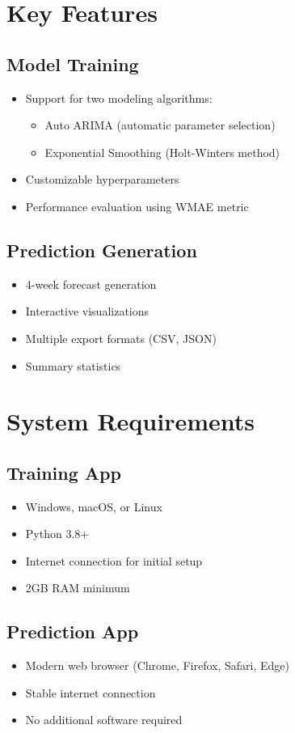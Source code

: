 \section{Key Features}

\subsection{Model Training}
\begin{itemize}
	\item Support for two modeling algorithms:
	\begin{itemize}
		\item Auto ARIMA (automatic parameter selection)
		\item Exponential Smoothing (Holt-Winters method)
	\end{itemize}
	\item Customizable hyperparameters
	\item Performance evaluation using WMAE metric
\end{itemize}

\subsection{Prediction Generation}
\begin{itemize}
	\item 4-week forecast generation
	\item Interactive visualizations
	\item Multiple export formats (CSV, JSON)
	\item Summary statistics
\end{itemize}

\section{System Requirements}

\subsection{Training App}
\begin{itemize}
	\item Windows, macOS, or Linux
	\item Python 3.8+
	\item Internet connection for initial setup
	\item 2GB RAM minimum
\end{itemize}

\subsection{Prediction App}
\begin{itemize}
	\item Modern web browser (Chrome, Firefox, Safari, Edge)
	\item Stable internet connection
	\item No additional software required
\end{itemize}